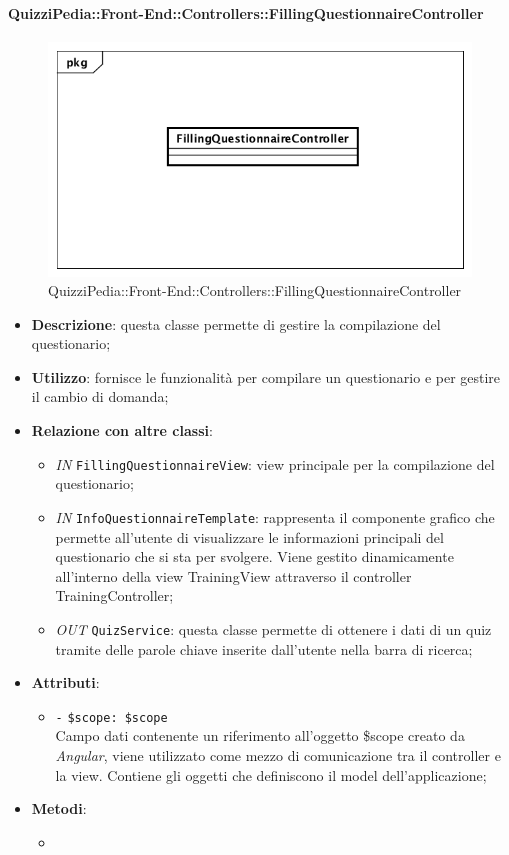 \paragraph{QuizziPedia::Front-End::Controllers::FillingQuestionnaireController}
\begin{figure}
	\centering
	\includegraphics[scale=0.45]{UML/Classi/Front-End/QuizziPedia_Front-end_Controller_FillingQuestionnaireController.png}
	\caption{QuizziPedia::Front-End::Controllers::FillingQuestionnaireController}
\end{figure}
\begin{itemize}
	\item \textbf{Descrizione}: questa classe permette di gestire la compilazione del questionario;
	\item \textbf{Utilizzo}: fornisce le funzionalità per compilare un questionario e per gestire il cambio di domanda;
	\item \textbf{Relazione con altre classi}:
	\begin{itemize}
		\item \textit{IN} \texttt{FillingQuestionnaireView}: view principale per la compilazione del questionario;  
		\item \textit{IN} \texttt{InfoQuestionnaireTemplate}: rappresenta il componente grafico che permette all'utente di visualizzare le informazioni principali del questionario che si sta per svolgere. Viene gestito dinamicamente all'interno della view TrainingView attraverso il controller TrainingController;
		\item \textit{OUT} \texttt{QuizService}: questa classe permette di ottenere i dati di un quiz tramite delle parole chiave inserite dall'utente nella barra di ricerca;
	\end{itemize}
	\item \textbf{Attributi}:
	\begin{itemize}
		\item \texttt{-} \texttt{\$scope: \$scope} \\
		Campo dati contenente un riferimento all’oggetto \$scope creato da \textit{Angular}, viene utilizzato come mezzo di comunicazione tra il controller e la view. Contiene gli oggetti che definiscono il model dell’applicazione;
	\end{itemize}
	\item \textbf{Metodi}:
	\begin{itemize}
		\item 
	\end{itemize}
\end{itemize}

